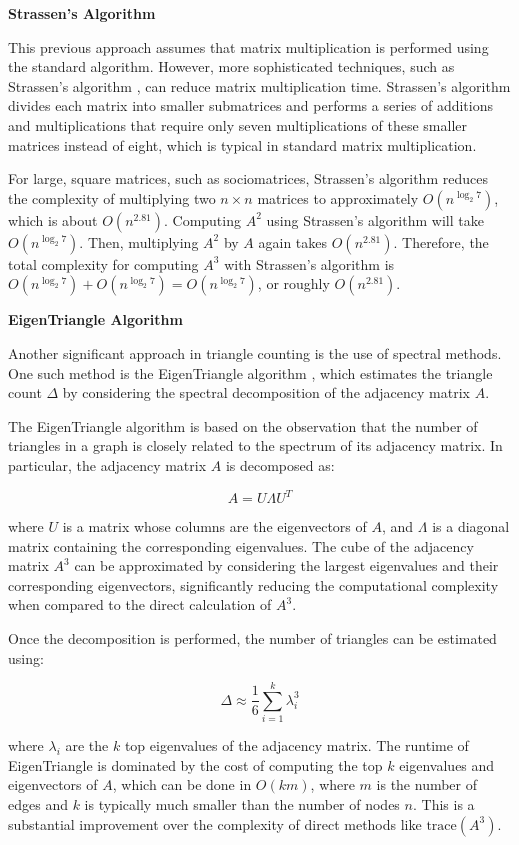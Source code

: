 \documentclass[12pt]{article}
\newcommand{\subsubsubsection}[1]{
  \vspace{1em} %
  \noindent\textbf{#1} %
  \vspace{0.5em} %
}
\begin{document}
\subsubsubsection{Strassen's Algorithm}

This previous approach assumes that matrix multiplication is performed using the standard algorithm.
However, more sophisticated techniques, such as Strassen's algorithm \cite{strassen_gaussian_1969}, can reduce matrix multiplication time.
Strassen's algorithm divides each matrix into smaller submatrices and performs a series of additions and multiplications that require only seven multiplications of these smaller matrices instead of eight, which is typical in standard matrix multiplication.

For large, square matrices, such as sociomatrices, Strassen's algorithm reduces the complexity of multiplying two $n \times n$ matrices to approximately $O(n^{\log_2 7})$, which is about $O(n^{2.81})$.
Computing $A^2$ using Strassen's algorithm will take $O(n^{\log_2 7})$.
Then, multiplying $A^2$ by $A$ again takes $O(n^{2.81})$.
Therefore, the total complexity for computing $A^3$ with Strassen's algorithm is $O(n^{\log_2 7}) + O(n^{\log_2 7}) = O(n^{\log_2 7})$, or roughly $O(n^{2.81})$.

\subsubsubsection{EigenTriangle Algorithm}

Another significant approach in triangle counting is the use of spectral methods.
One such method is the EigenTriangle algorithm \cite{tsourakakis_fast_2008}, which estimates the triangle count $\Delta$ by considering the spectral decomposition of the adjacency matrix $A$.

The EigenTriangle algorithm is based on the observation that the number of triangles in a graph is closely related to the spectrum of its adjacency matrix.
In particular, the adjacency matrix $A$ is decomposed as:

\[
A = U \Lambda U^T
\]

where $U$ is a matrix whose columns are the eigenvectors of $A$, and $\Lambda$ is a diagonal matrix containing the corresponding eigenvalues.
The cube of the adjacency matrix $A^3$ can be approximated by considering the largest eigenvalues and their corresponding eigenvectors, significantly reducing the computational complexity when compared to the direct calculation of $A^3$.

Once the decomposition is performed, the number of triangles can be estimated using:

\[
\Delta \approx \frac{1}{6} \sum_{i=1}^{k} \lambda_i^3
\]

where $\lambda_i$ are the $k$ top eigenvalues of the adjacency matrix.
The runtime of EigenTriangle is dominated by the cost of computing the top $k$ eigenvalues and eigenvectors of $A$, which can be done in $O(k m)$, where $m$ is the number of edges and $k$ is typically much smaller than the number of nodes $n$.
This is a substantial improvement over the complexity of direct methods like $\mathrm{trace}(A^3)$.
\end{document}
